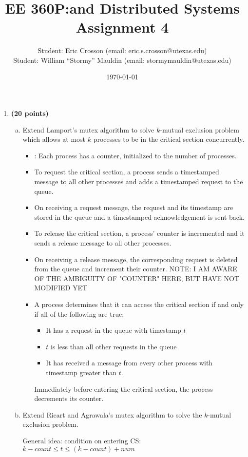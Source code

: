 \documentclass[11pt]{article}
\newcounter{problem}
\begin{document}
\title{EE 360P:\@Concurrent and Distributed Systems \\ Assignment 4}
\author{Student: Eric Crosson (email: eric.s.crosson@utexas.edu)\\
  Student: William ``Stormy'' Mauldin (email: stormymauldin@utexas.edu)}
\date{\today}
\maketitle

\begin{enumerate}
\item \textbf{(20 points)} 
\begin{enumerate}[(a)]
\item Extend Lamport's mutex algorithm to solve $k$-mutual exclusion problem which allows at most $k$ processes to be in the critical section concurrently.

\begin{itemize}
\item {}: Each process has a counter, initialized to the number of processes.
\item To request the critical section, a process sends a timestamped message to all other processes and adds a timestamped request to the queue.
\item On receiving a request message, the request and its timestamp are stored in the queue and a timestamped acknowledgement is sent back.
\item To release the critical section, a process' counter is incremented and it sends a release message to all other processes.
\item On receiving a release message, the corresponding request is deleted from the queue and increment their counter. NOTE: I AM AWARE OF THE AMBIGUITY OF "COUNTER" HERE, BUT HAVE NOT MODIFIED YET
\item A process determines that it can access the critical section if and only if all of the following are true: 
\begin{itemize}
\item It has a request in the queue with timestamp $t$
\item $t$ is less than all other requests in the queue
\item It has received a message from every other process with timestamp greater than $t$.
\end{itemize}
Immediately before entering the critical section, the process decrements its counter.
\end{itemize}


\item Extend Ricart and Agrawala's mutex algorithm to solve the $k$-mutual exclusion problem.   

General idea: condition on entering CS: $k - count \leq t \leq (k - count) + num$

\end{enumerate}
\end{enumerate}
\end{document}
